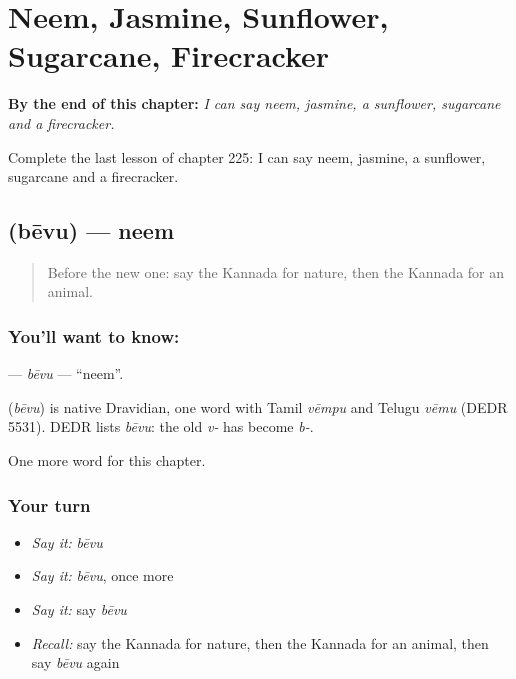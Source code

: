 
\chapter{Neem, Jasmine, Sunflower, Sugarcane, Firecracker}
\label{ch:ka-neem-jasmine-sunflower-sugarcane-firecracker}

\begin{chapteropening}
\textbf{By the end of this chapter:} \emph{I can say neem, jasmine, a sunflower, sugarcane and a firecracker.}

Complete the last lesson of chapter 225: I can say neem, jasmine, a sunflower, sugarcane and a firecracker.
\end{chapteropening}

\section[\texorpdfstring{\kn{ಬೇವು} (bēvu)}{ಬೇವು (bēvu)}]{ (bēvu) — neem}

\label{lesson:KA-C225-bevu}



\begin{quote}
Before the new one: say the Kannada for nature, then the Kannada for an animal.
\end{quote}

\subsection*{You'll want to know: }
\textbf{} — \emph{bēvu} — \textquotedblleft{}neem\textquotedblright{}.

\begin{cousinweb}
\textbf{} (\emph{bēvu}) is native Dravidian, one word with Tamil \emph{vēmpu} and Telugu \emph{vēmu} (DEDR 5531). DEDR lists \emph{bēvu}: the old \emph{v-} has become \emph{b-}.
\end{cousinweb}

\begin{grammarlens}[title={What you've built}]
One more word for this chapter.
\end{grammarlens}

\subsection*{Your turn}
\begin{itemize}
\raggedright
  \item \emph{Say it:} \emph{bēvu}
  \item \emph{Say it:} \emph{bēvu}, once more
  \item \emph{Say it:} say \emph{bēvu}
  \item \emph{Recall:} say the Kannada for nature, then the Kannada for an animal, then say \emph{bēvu} again
\end{itemize}

